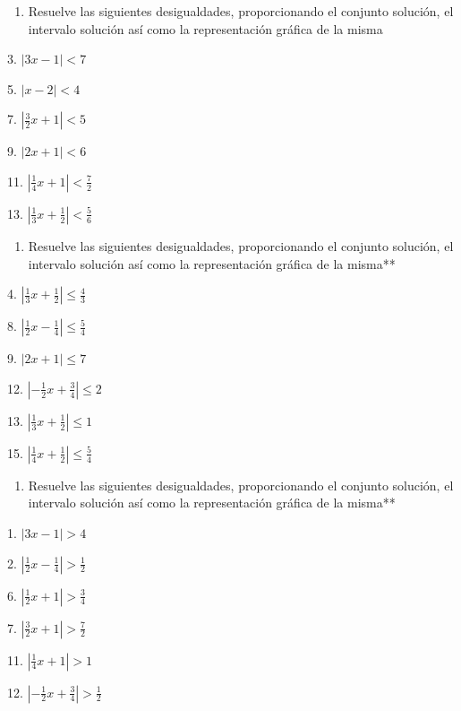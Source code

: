 \documentclass[]{book}
\providecommand{\tightlist}{%
  \setlength{\itemsep}{0pt}\setlength{\parskip}{0pt}}
\begin{document}
\begin{enumerate}
\def\labelenumi{\arabic{enumi}.}
\setcounter{enumi}{17}
\tightlist
\item
  Resuelve las siguientes desigualdades, proporcionando el conjunto
  solución, el intervalo solución así como la representación gráfica de
  la misma
\end{enumerate}

\begin{multicols}{2}
3. $|3x-1|<7$

5. $|x-2|<4$

7. $|\frac{3}{2}x+1|<5$

9. $|2x+1|<6$

11. $|\frac{1}{4}x+1|<\frac{7}{2}$

13. $|\frac{1}{3}x+\frac{1}{2}|<\frac{5}{6}$
\end{multicols}

\begin{enumerate}
\def\labelenumi{\arabic{enumi}.}
\setcounter{enumi}{18}
\tightlist
\item
  Resuelve las siguientes desigualdades, proporcionando el conjunto
  solución, el intervalo solución así como la representación gráfica de
  la misma**
\end{enumerate}

\begin{multicols}{2}
4. $|\frac{1}{3}x+\frac{1}{2}|\leq \frac{4}{3}$

8. $|\frac{1}{2}x-\frac{1}{4}|\leq \frac{5}{4}$

9. $|2x+1|\leq 7$

12. $|-\frac{1}{2}x+\frac{3}{4}|\leq 2$

13. $|\frac{1}{3}x+\frac{1}{2}|\leq 1$

15. $|\frac{1}{4}x+\frac{1}{2}|\leq \frac{5}{4}$
\end{multicols}

\begin{enumerate}
\def\labelenumi{\arabic{enumi}.}
\setcounter{enumi}{19}
\tightlist
\item
  Resuelve las siguientes desigualdades, proporcionando el conjunto
  solución, el intervalo solución así como la representación gráfica de
  la misma**
\end{enumerate}

\begin{multicols}{2}
1. $|3x-1|>4$

2. $|\frac{1}{2}x-\frac{1}{4}|>\frac{1}{2}$

6. $|\frac{1}{2}x+1|>\frac{3}{4}$

7. $|\frac{3}{2}x+1|>\frac{7}{2}$

11. $|\frac{1}{4}x+1|>1$

12. $|-\frac{1}{2}x+\frac{3}{4}|>\frac{1}{2}$
\end{multicols}
\end{document}
